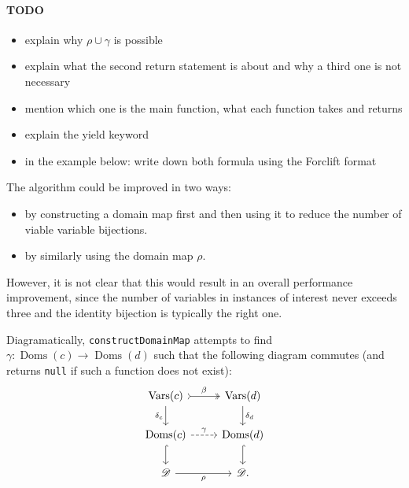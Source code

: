\documentclass{article}
\theoremstyle{definition}
\DeclareMathOperator{\Doms}{Doms}
\DeclareMathOperator{\Vars}{Vars}
\begin{document}
\paragraph{TODO}
\begin{itemize}
\item explain why $\rho \cup \gamma$ is possible
\item explain what the second return statement is about and why a third one is not necessary
\item mention which one is the main function, what each function takes and returns
\item explain the yield keyword
\item in the example below: write down both formula using the Forclift format
\end{itemize}

The algorithm could be improved in two ways:
\begin{itemize}
\item by constructing a domain map first and then using it to reduce the number of viable variable bijections.
\item by similarly using the domain map $\rho$.
\end{itemize}
However, it is not clear that this would result in an overall performance improvement, since the number of variables in instances of interest never exceeds three and the identity bijection is typically the right one.

Diagramatically, \texttt{constructDomainMap} attempts to find $\gamma\colon \Doms(c) \to \Doms(d)$ such that the following diagram commutes (and returns \texttt{null} if such a function does not exist):
\[
\begin{tikzcd}
  \Vars(c) \ar[r, tail, two heads, "\beta"] \arrow[d, swap, "\delta_c"] & \Vars(d) \ar[d, "\delta_d"] \\
  \Doms(c) \ar[r, dashed, "\gamma"] \ar[d, hookrightarrow] & \Doms(d) \ar[d, hookrightarrow] \\
  \mathscr{D} \ar[r, swap, "\rho"] & \mathscr{D}.
\end{tikzcd}
\]
\end{document}
